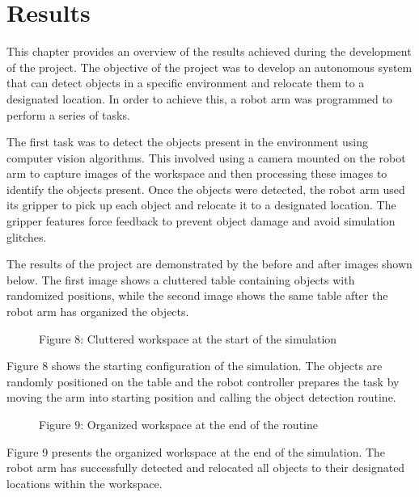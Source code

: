
\chapter{Results} %
\label{results} %



This chapter provides an overview of the results achieved during the development of the project. The objective of the project was to develop an autonomous system that can detect objects in a specific environment and relocate them to a designated location. In order to achieve this, a robot arm was programmed to perform a series of tasks. 

The first task was to detect the objects present in the environment using computer vision algorithms. This involved using a camera mounted on the robot arm to capture images of the workspace and then processing these images to identify the objects present. Once the objects were detected, the robot arm used its gripper to pick up each object and relocate it to a designated location. The gripper features force feedback to prevent object damage and avoid simulation glitches.

The results of the project are demonstrated by the before and after images shown below. The first image shows a cluttered table containing objects with randomized positions, while the second image shows the same table after the robot arm has organized the objects.

\begin{figure}[!htbp]
    \centering
    \caption{Figure 8: Cluttered workspace at the start of the simulation }
\end{figure}

Figure 8 shows the starting configuration of the simulation. The objects are randomly positioned on the table and the robot controller prepares the task by moving the arm into starting position and calling the object detection routine.

\begin{figure}[!htbp]
    \centering
    \caption{Figure 9: Organized workspace at the end of the routine }
\end{figure}

Figure 9 presents the organized workspace at the end of the simulation. The robot arm has successfully detected and relocated all objects to their designated locations within the workspace.

